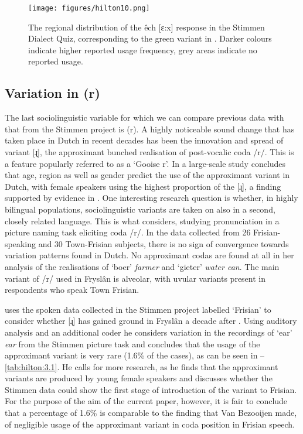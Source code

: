 \documentclass[output=paper,hidelinks]{langscibook}
\begin{document}
 \begin{figure}
  \texttt{[image: figures/hilton10.png]}
  \caption{The regional distribution of the êch [ɛ:x] response in the Stimmen Dialect Quiz, corresponding to the green variant in . Darker colours indicate higher reported usage frequency, grey areas indicate no reported usage.}
 \label{fig:hilton:10}
\end{figure}



\subsection{Variation in (r)} 
\largerpage
The last sociolinguistic variable for which we can compare previous data with that from the Stimmen project is (r). A highly noticeable sound change that has taken place in Dutch in recent decades has been the innovation and spread of variant [ɻ], the approximant bunched realisation of post-vocalic coda /r/. This is a feature popularly referred to as a ‘Gooise r’. In a large-scale study \citet{Sebregts2015} concludes that age, region as well as gender predict the use of the approximant variant in Dutch, with female speakers using the highest proportion of the [ɻ], a finding supported by evidence in \citet{VanBezooijen2005}. One interesting research question is whether, in highly bilingual populations, sociolinguistic variants are taken on also in a second, closely related language. This is what \citet{Bezooijen2009} considers, studying pronunciation in a picture naming task eliciting coda /r/. In the data collected from 26 Frisian-speaking and 30 Town-Frisian subjects, there is no sign of convergence towards variation patterns found in Dutch. No approximant codas are found at all in her analysis of the realisations of ‘boer’ \textit{farmer} and ‘gieter’ \textit{water can}. The main variant of /r/ used in Fryslân is alveolar, with uvular variants present in respondents who speak Town Frisian. 

\citet{Bakker2018} uses the spoken data collected in the Stimmen project labelled ‘Frisian’ to consider whether [ɻ] has gained ground in Fryslân a decade after \citet{Bezooijen2009}. Using auditory analysis and an additional coder he considers variation in the recordings of ‘ear’ \textit{ear} from the Stimmen picture task and concludes that the usage of the approximant variant is very rare (1.6\% of the cases), as can be seen in --\ref{tab:hilton:3.1}. He calls for more research, as he finds that the approximant variants are produced by young female speakers and discusses whether the Stimmen data could show the first stage of introduction of the variant to Frisian. For the purpose of the aim of the current paper, however, it is fair to conclude that a percentage of 1.6\% is comparable to the finding that Van Bezooijen made, of negligible usage of the approximant variant in coda position in Frisian speech.
\end{document}
